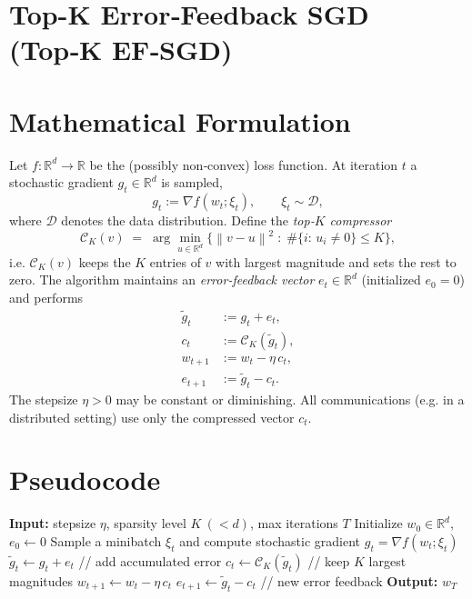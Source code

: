 \documentclass{article}
\newcommand{\R}{\mathbb{R}}
\newcommand{\norm}[1]{\left\lVert#1\right\rVert}
\newcommand{\topK}[1]{\mathcal{C}_K\!\left(#1\right)}
\begin{document}
\section*{Top-K Error‑Feedback SGD (Top‑K EF‑SGD)}

\section*{Mathematical Formulation}
Let $f:\R^d\!\to\!\R$ be the (possibly non‑convex) loss function.  
At iteration $t$ a stochastic gradient $g_t\in\R^d$ is sampled,
\[
g_t:=\nabla f(w_t;\xi_t),\qquad \xi_t\sim\mathcal{D},
\]
where $\mathcal{D}$ denotes the data distribution.  
Define the \emph{top‑$K$ compressor}
\[
\topK{v}\;=\; \arg\min_{u\in\R^d}\Big\{\norm{v-u}^2\;:\; \#\{i:\,u_i\neq0\}\le K\Big\},
\]
i.e. $\topK{v}$ keeps the $K$ entries of $v$ with largest magnitude and sets the rest to zero.
The algorithm maintains an \emph{error‑feedback vector} $e_t\in\R^d$ (initialized $e_0=0$) and performs
\begin{align}
\tilde g_t &:= g_t + e_t, \tag{1}\\
c_t &:= \topK{\tilde g_t}, \tag{2}\\
w_{t+1} &:= w_t - \eta\,c_t, \tag{3}\\
e_{t+1} &:= \tilde g_t - c_t. \tag{4}
\end{align}
The stepsize $\eta>0$ may be constant or diminishing.  
All communications (e.g. in a distributed setting) use only the compressed vector $c_t$.

\section*{Pseudocode}
\begin{algorithm}[H]
\caption{Top‑K Error‑Feedback SGD}
\begin{algorithmic}[1]
\STATE \textbf{Input:} stepsize $\eta$, sparsity level $K\ (<d)$, max iterations $T$
\STATE Initialize $w_0\in\R^d$, $e_0\gets 0$
    \STATE Sample a minibatch $\xi_t$ and compute stochastic gradient $g_t=\nabla f(w_t;\xi_t)$
    \STATE $\tilde g_t \gets g_t+e_t$ \hfill // add accumulated error
    \STATE $c_t \gets \topK{\tilde g_t}$ \hfill // keep $K$ largest magnitudes
    \STATE $w_{t+1} \gets w_t - \eta\,c_t$
    \STATE $e_{t+1} \gets \tilde g_t - c_t$ \hfill // new error feedback
\ENDFOR
\STATE \textbf{Output:} $w_T$
\end{algorithmic}
\end{algorithm}
\end{document}
